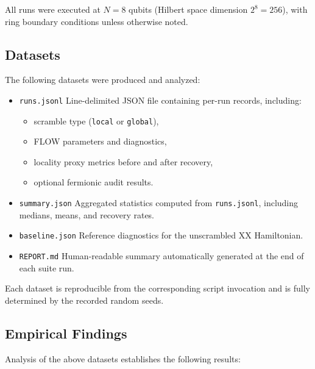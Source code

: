 All runs were executed at $N=8$ qubits (Hilbert space dimension $2^8=256$),
with ring boundary conditions unless otherwise noted.

\subsection*{Datasets}

The following datasets were produced and analyzed:

\begin{itemize}
    \item \texttt{runs.jsonl}  
    Line-delimited JSON file containing per-run records, including:
    \begin{itemize}
        \item scramble type (\texttt{local} or \texttt{global}),
        \item FLOW parameters and diagnostics,
        \item locality proxy metrics before and after recovery,
        \item optional fermionic audit results.
    \end{itemize}

    \item \texttt{summary.json}  
    Aggregated statistics computed from \texttt{runs.jsonl}, including medians,
    means, and recovery rates.

    \item \texttt{baseline.json}  
    Reference diagnostics for the unscrambled XX Hamiltonian.

    \item \texttt{REPORT.md}  
    Human-readable summary automatically generated at the end of each suite run.
\end{itemize}

Each dataset is reproducible from the corresponding script invocation and is
fully determined by the recorded random seeds.

\subsection*{Empirical Findings}

Analysis of the above datasets establishes the following results:

